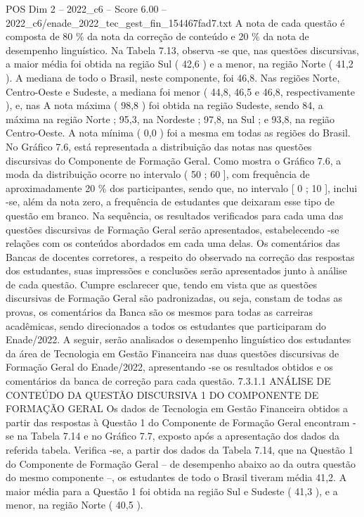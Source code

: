 \begin{textsample}{POS Dim 2 – 2022\_c6 – Score 6.00 – 2022\_c6/enade\_2022\_tec\_gest\_fin\_154467fad7.txt}
A nota de cada questão é composta de 80 \% da nota da correção de conteúdo e 20 \% da nota de desempenho linguístico.
Na Tabela 7.13, observa -se que, nas questões discursivas, a maior média foi obtida na região Sul ( 42,6 ) e a menor, na região Norte ( 41,2 ).
A mediana de todo o Brasil, neste componente, foi 46,8.
Nas regiões Norte, Centro-Oeste e Sudeste, a mediana foi menor ( 44,8, 46,5 e 46,8, respectivamente ), e, nas A nota máxima ( 98,8 ) foi obtida na região Sudeste, sendo 84, a máxima na região Norte ; 95,3, na Nordeste ; 97,8, na Sul ; e 93,8, na região Centro-Oeste.
A nota mínima ( 0,0 ) foi a mesma em todas as regiões do Brasil.
No Gráfico 7.6, está representada a distribuição das notas nas questões discursivas do Componente de Formação Geral.
Como mostra o Gráfico 7.6, a moda da distribuição ocorre no intervalo ( 50 ; 60 ], com frequência de aproximadamente 20 \% dos participantes, sendo que, no intervalo [ 0 ; 10 ], inclui -se, além da nota zero, a frequência de estudantes que deixaram esse tipo de questão em branco.
Na sequência, os resultados verificados para cada uma das questões discursivas de Formação Geral serão apresentados, estabelecendo -se relações com os conteúdos abordados em cada uma delas.
Os comentários das Bancas de docentes corretores, a respeito do observado na correção das respostas dos estudantes, suas impressões e conclusões serão apresentados junto à análise de cada questão.
Cumpre esclarecer que, tendo em vista que as questões discursivas de Formação Geral são padronizadas, ou seja, constam de todas as provas, os comentários da Banca são os mesmos para todas as carreiras acadêmicas, sendo direcionados a todos os estudantes que participaram do Enade/2022.
A seguir, serão analisados o desempenho linguístico dos estudantes da área de Tecnologia em Gestão Financeira nas duas questões discursivas de Formação Geral do Enade/2022, apresentando -se os resultados obtidos e os comentários da banca de correção para cada questão. 7.3.1.1 ANÁLISE DE CONTEÚDO DA QUESTÃO DISCURSIVA 1 DO COMPONENTE DE FORMAÇÃO GERAL Os dados de Tecnologia em Gestão Financeira obtidos a partir das respostas à Questão 1 do Componente de Formação Geral encontram -se na Tabela 7.14 e no Gráfico 7.7, exposto após a apresentação dos dados da referida tabela.
Verifica -se, a partir dos dados da Tabela 7.14, que na Questão 1 do Componente de Formação Geral – de desempenho abaixo ao da outra questão do mesmo componente –, os estudantes de todo o Brasil tiveram média 41,2.
A maior média para a Questão 1 foi obtida na região Sul e Sudeste ( 41,3 ), e a menor, na região Norte ( 40,5 ).

\end{textsample}
